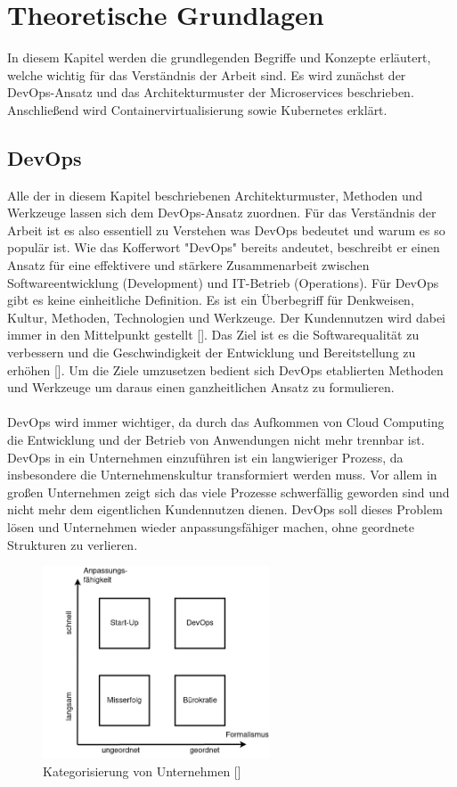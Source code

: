 \section{Theoretische Grundlagen}

In diesem Kapitel werden die grundlegenden Begriffe und Konzepte erläutert, welche wichtig für das Verständnis der Arbeit sind. Es wird zunächst der DevOps-Ansatz und das Architekturmuster der Microservices beschrieben. Anschließend wird Containervirtualisierung sowie Kubernetes erklärt.

\subsection{DevOps}

Alle der in diesem Kapitel beschriebenen Architekturmuster, Methoden und Werkzeuge lassen sich dem DevOps-Ansatz zuordnen. Für das Verständnis der Arbeit ist es also essentiell zu Verstehen was DevOps bedeutet und warum es so populär ist. Wie das Kofferwort "DevOps" bereits andeutet, beschreibt er einen Ansatz für eine effektivere und stärkere Zusammenarbeit zwischen Softwareentwicklung (Development) und IT-Betrieb (Operations). Für DevOps gibt es keine einheitliche Definition. Es ist ein Überbegriff für Denkweisen, Kultur, Methoden, Technologien und Werkzeuge. Der Kundennutzen wird dabei immer in den Mittelpunkt gestellt [\cite[S. 1]{halstenbergDevOps2020}]. Das Ziel ist es die Softwarequalität zu verbessern und die Geschwindigkeit der Entwicklung und Bereitstellung zu erhöhen [\cite[S. 6]{arundelCloud2019}]. Um die Ziele umzusetzen bedient sich DevOps etablierten Methoden und Werkzeuge um daraus einen ganzheitlichen Ansatz zu formulieren. \\
\\
DevOps wird immer wichtiger, da durch das Aufkommen von Cloud Computing die Entwicklung und der Betrieb von Anwendungen nicht mehr trennbar ist. DevOps in ein Unternehmen einzuführen ist ein langwieriger Prozess, da insbesondere die Unternehmenskultur transformiert werden muss. Vor allem in großen Unternehmen zeigt sich das viele Prozesse schwerfällig geworden sind und nicht mehr dem eigentlichen Kundennutzen dienen. DevOps soll dieses Problem lösen und Unternehmen wieder anpassungsfähiger machen, ohne geordnete Strukturen zu verlieren.

\begin{figure}[H] 
    \centering
    \includegraphics[width=0.6\textwidth]{figures/DevOpsDiagramm.png}
    \caption{Kategorisierung von Unternehmen [\cite[S. 11]{halstenbergDevOps2020}]}
\end{figure}

